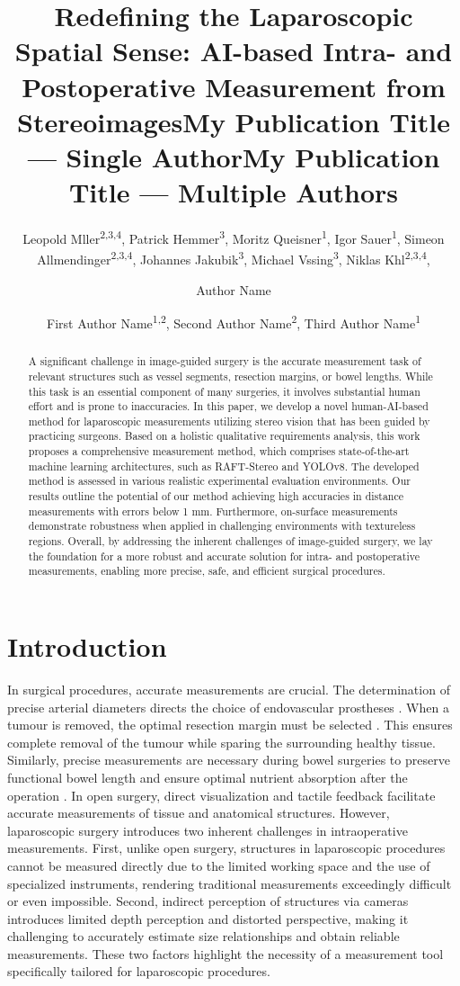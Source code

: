 \documentclass[letterpaper]{article} %
\title{Redefining the Laparoscopic Spatial Sense: AI-based Intra- and Postoperative Measurement from Stereoimages}
\author{
    Leopold Mller\textsuperscript{\rm 2,3,4},  
    Patrick Hemmer\textsuperscript{\rm 3},
    Moritz Queisner\textsuperscript{\rm 1},
    Igor Sauer\textsuperscript{\rm 1},
    Simeon Allmendinger\textsuperscript{\rm 2,3,4},
    Johannes Jakubik\textsuperscript{\rm 3},
    Michael Vssing\textsuperscript{\rm 3},
    Niklas Khl\textsuperscript{\rm 2,3,4},\\
}
\title{My Publication Title --- Single Author}
\author {
    Author Name
}
\title{My Publication Title --- Multiple Authors}
\author {
    First Author Name\textsuperscript{\rm 1,\rm 2},
    Second Author Name\textsuperscript{\rm 2},
    Third Author Name\textsuperscript{\rm 1}
}
\begin{document}
\maketitle

\begin{abstract}
A significant challenge in image-guided surgery is the accurate measurement task of relevant structures such as vessel segments, resection margins, or bowel lengths. While this task is an essential component of many surgeries, it involves substantial human effort and is prone to inaccuracies. In this paper, we develop a novel human-AI-based method for laparoscopic measurements utilizing stereo vision that has been guided by practicing surgeons. Based on a holistic qualitative requirements analysis, this work proposes a comprehensive measurement method, which comprises state-of-the-art machine learning architectures, such as RAFT-Stereo and YOLOv8. The developed method is assessed in various realistic experimental evaluation environments. Our results outline the potential of our method achieving high accuracies in distance measurements with errors below 1 mm. Furthermore, on-surface measurements demonstrate robustness when applied in challenging environments with textureless regions. Overall, by addressing the inherent challenges of image-guided surgery, we lay the foundation for a more robust and accurate solution for intra- and postoperative measurements, enabling more precise, safe, and efficient surgical procedures.
\end{abstract}

\section{Introduction}

In surgical procedures, accurate measurements are crucial. The determination of precise arterial diameters directs the choice of endovascular prostheses \cite{carvalho_measuring_2006}. When a tumour is removed, the optimal resection margin must be selected \cite{Bilgeri2020TheEO}. This ensures complete removal of the tumour while sparing the surrounding healthy tissue. Similarly, precise measurements are necessary during bowel surgeries to preserve functional bowel length and ensure optimal nutrient absorption after the operation \cite{Gazer2017AccuracyAI}. In open surgery, direct visualization and tactile feedback facilitate accurate measurements of tissue and anatomical structures. However, laparoscopic surgery introduces two inherent challenges in intraoperative measurements. First, unlike open surgery, structures in laparoscopic procedures cannot be measured directly due to the limited working space and the use of specialized instruments, rendering traditional measurements exceedingly difficult or even impossible. Second, indirect perception of structures via cameras introduces limited depth perception and distorted perspective, making it challenging to accurately estimate size relationships and obtain reliable measurements. These two factors highlight the necessity of a measurement tool specifically tailored for laparoscopic procedures.
\end{document}
